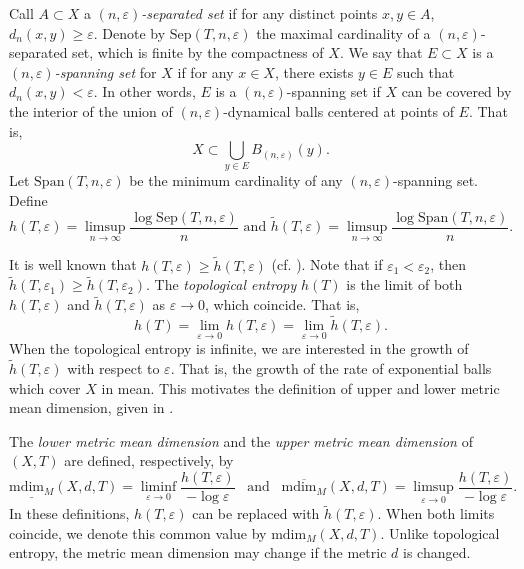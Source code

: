 \documentclass[sn-mathphys-num]{sn-jnl}%
\theoremstyle{thmstyleone}%
\theoremstyle{thmstyletwo}%
\theoremstyle{thmstylethree}%
\begin{document}
Call $A \subset X$ a \textit{$(n, \varepsilon)$-separated set} if for any distinct points $x, y \in A$, $d_n(x, y) \geq \varepsilon$. Denote by $\text{Sep}(T, n, \varepsilon)$ the maximal cardinality of a $(n, \varepsilon)$-separated set, which is finite by the compactness of $X$. We say that $E \subset X$ is a \textit{$(n, \varepsilon)$-spanning set} for $X$ if for any $x \in X$, there exists $y \in E$ such that $d_n(x, y) < \varepsilon$. In other words, $E$ is a $(n, \varepsilon)$-spanning set if $X$ can be covered by the interior of the union of $(n, \varepsilon)$-dynamical balls centered at points of $E$. That is,
\begin{equation*}
    X \subset  \bigcup\limits_{y \in E} B_{(n, \varepsilon)}(y).
\end{equation*}
Let $\text{Span}(T, n, \varepsilon)$ be the minimum cardinality of any $(n, \varepsilon)$-spanning set. Define 
\[
h(T, \varepsilon) = \limsup\limits_{n \to \infty} \frac{\log \text{Sep}(T, n, \varepsilon)}{n} \text{ and } \widetilde{h}(T, \varepsilon) = \limsup\limits_{n \to \infty} \frac{\log \text{Span}(T, n, \varepsilon)}{n}.
\]

It is well known that $h(T, \varepsilon) \geq \widetilde{h}(T, \varepsilon)$ (cf. \cite[Chapter 3]{katok_hasselblatt_1995}). Note that if $\varepsilon_1 < \varepsilon_2$, then $\widetilde{h}(T, \varepsilon_1) \geq \widetilde{h}(T, \varepsilon_2)$. The \textit{topological entropy} $h(T)$ is the limit of both $h(T, \varepsilon)$ and $\widetilde{h}(T, \varepsilon)$ as $\varepsilon \to 0$, which coincide. That is,
\begin{equation*}
    h(T) = \lim_{\varepsilon \to 0} h(T, \varepsilon) = \lim_{\varepsilon \to 0} \widetilde{h}(T, \varepsilon).
\end{equation*}
When the topological entropy is infinite, we are interested in the growth of $\widetilde{h}(T, \varepsilon)$ with respect to $\varepsilon$. That is, the growth of the rate of exponential balls which cover $X$ in mean. This motivates the definition of upper and lower metric mean dimension, given in \cite{lindenstrauss_weiss_2000}.

The \textit{lower metric mean dimension} and the \textit{upper metric mean dimension} of $(X, T)$ are defined, respectively, by
\begin{equation}\label{eq:def-metric-mean-dim}
\underline{\text{mdim}_M}(X, d, T) = \liminf\limits_{\varepsilon \to 0} \frac{h(T, \varepsilon)}{-\log\varepsilon}
\;\;\;\text{and}\;\;\;\overline{\text{mdim}_M}(X, d, T) = \limsup\limits_{\varepsilon \to 0} \frac{h(T, \varepsilon)}{-\log\varepsilon}.
\end{equation}
In these definitions, $h(T, \varepsilon)$ can be replaced with $\widetilde{h}(T, \varepsilon)$. When both limits coincide, we denote this common value by $\text{mdim}_M(X, d, T)$. Unlike topological entropy, the metric mean dimension may change if the metric $d$ is changed.
\end{document}

